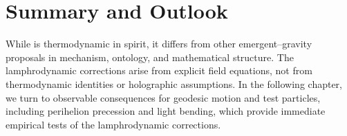 \section{Summary and Outlook}

While \rsvpabbr{} is thermodynamic in spirit, it differs from other
emergent--gravity proposals in mechanism, ontology, and mathematical
structure. The lamphrodynamic corrections arise from explicit field
equations, not from thermodynamic identities or holographic assumptions. In
the following chapter, we turn to observable consequences for geodesic
motion and test particles, including perihelion precession and light bending,
which provide immediate empirical tests of the lamphrodynamic corrections.

\clearpage

